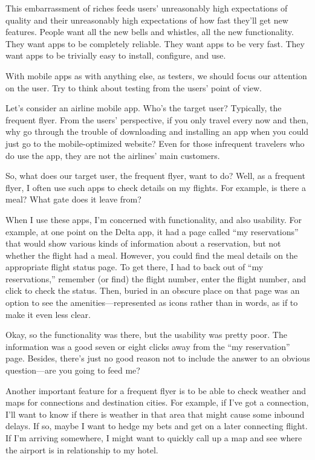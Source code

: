 This embarrassment of riches feeds users’ unreasonably high expectations of quality and their unreasonably high expectations of how fast they’ll get new features. People want all the new bells and whistles, all the new functionality. They want apps to be completely reliable. They want apps to be very fast. They want apps to be trivially easy to install, configure, and use.

With mobile apps as with anything else, as testers, we should focus our attention on the user. Try to think about testing from the users’ point of view.

Let’s consider an airline mobile app. Who’s the target user? Typically, the frequent flyer. From the users’ perspective, if you only travel every now and then, why go through the trouble of downloading and installing an app when you could just go to the mobile-optimized website? Even for those infrequent travelers who do use the app, they are not the airlines’ main customers.

So, what does our target user, the frequent flyer, want to do? Well, as a frequent flyer, I often use such apps to check details on my flights. For example, is there a meal? What gate does it leave from?

When I use these apps, I’m concerned with functionality, and also usability. For example, at one point on the Delta app, it had a page called “my reservations” that would show various kinds of information about a reservation, but not whether the flight had a meal. However, you could find the meal details on the appropriate flight status page. To get there, I had to back out of “my reservations,” remember (or find) the flight number, enter the flight number, and click to check the status. Then, buried in an obscure place on that page was an option to see the amenities—represented as icons rather than in words, as if to make it even less clear.

Okay, so the functionality was there, but the usability was pretty poor. The information was a good seven or eight clicks away from the “my reservation” page. Besides, there’s just no good reason not to include the answer to an obvious question—are you going to feed me?

Another important feature for a frequent flyer is to be able to check weather and maps for connections and destination cities. For example, if I’ve got a connection, I’ll want to know if there is weather in that area that might cause some inbound delays. If so, maybe I want to hedge my bets and get on a later connecting flight. If I’m arriving somewhere, I might want to quickly call up a map and see where the airport is in relationship to my hotel.

